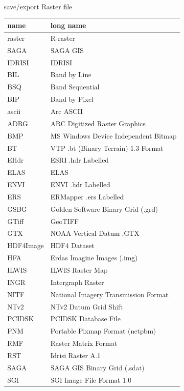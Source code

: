 \begin{frame}[fragile]{save/export Raster file}
\begin{tiny}
\begin{tabular}{ll}

 name&long name  \\     
\hline
  raster&R-raster  \\     
  SAGA&SAGA GIS  \\     
  IDRISI&IDRISI  \\     
  BIL&Band by Line  \\     
  BSQ&Band Sequential  \\     
  BIP&Band by Pixel  \\     
  ascii&Arc ASCII  \\     
  ADRG&ARC Digitized Raster Graphics  \\     
  BMP&MS Windows Device Independent Bitmap  \\     
  BT&VTP .bt (Binary Terrain) 1.3 Format  \\     
  EHdr&ESRI .hdr Labelled  \\     
  ELAS&ELAS  \\     
  ENVI&ENVI .hdr Labelled  \\     
  ERS&ERMapper .ers Labelled  \\     
  GSBG&Golden Software Binary Grid (.grd)  \\     
  GTiff&GeoTIFF  \\     
  GTX&NOAA Vertical Datum .GTX  \\     
  HDF4Image&HDF4 Dataset  \\     
  HFA&Erdas Imagine Images (.img)  \\     
  ILWIS&ILWIS Raster Map  \\     
  INGR&Intergraph Raster  \\      
  NITF&National Imagery Transmission Format  \\     
  NTv2&NTv2 Datum Grid Shift  \\     
  PCIDSK&PCIDSK Database File  \\     
  PNM&Portable Pixmap Format (netpbm)  \\     
  RMF&Raster Matrix Format  \\     
  RST&Idrisi Raster A.1  \\     
  SAGA&SAGA GIS Binary Grid (.sdat)  \\     
  SGI&SGI Image File Format 1.0  \\     
  
\end{tabular}
\end{tiny} 
\end{frame}


